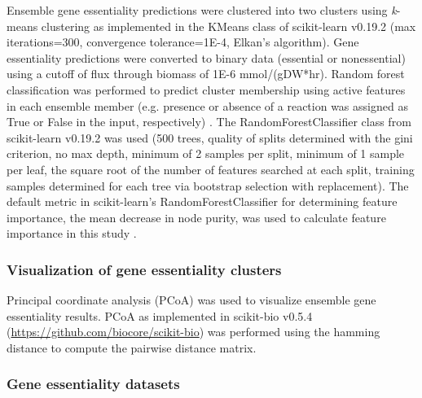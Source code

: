 \documentclass[11pt,onecolumn,notitlepage,openany,twoside]{book}
\begin{document}
\begin{refsection}
Ensemble gene essentiality predictions were clustered into two clusters using \textit{k}-means clustering as implemented in the KMeans class of scikit-learn v0.19.2 \cite{Pedregosa2011-wa} (max iterations=300, convergence tolerance=1E-4, Elkan’s \cite{Elkan2003-du} algorithm). Gene essentiality predictions were converted to binary data (essential or nonessential) using a cutoff of flux through biomass of 1E-6 mmol/(gDW*hr). Random forest classification was performed to predict cluster membership using active features in each ensemble member (e.g. presence or absence of a reaction was assigned as True or False in the input, respectively) \cite{Breiman2001-pl}. The RandomForestClassifier class from scikit-learn v0.19.2 was used (500 trees, quality of splits determined with the gini criterion, no max depth, minimum of 2 samples per split, minimum of 1 sample per leaf, the square root of the number of features searched at each split, training samples determined for each tree via bootstrap selection with replacement). The default metric in scikit-learn’s RandomForestClassifier for determining feature importance, the mean decrease in node purity, was used to calculate feature importance in this study \cite{Gordon1984-iw}.

\subsubsection{Visualization of gene essentiality clusters}

Principal coordinate analysis (PCoA) \cite{Gower1966-xt} was used to visualize ensemble gene essentiality results. PCoA as implemented in scikit-bio v0.5.4 (\url{https://github.com/biocore/scikit-bio}) was performed using the hamming distance \cite{Hamming1950-zv} to compute the pairwise distance matrix.

\subsubsection{Gene essentiality datasets}


\end{refsection}
\end{document}

